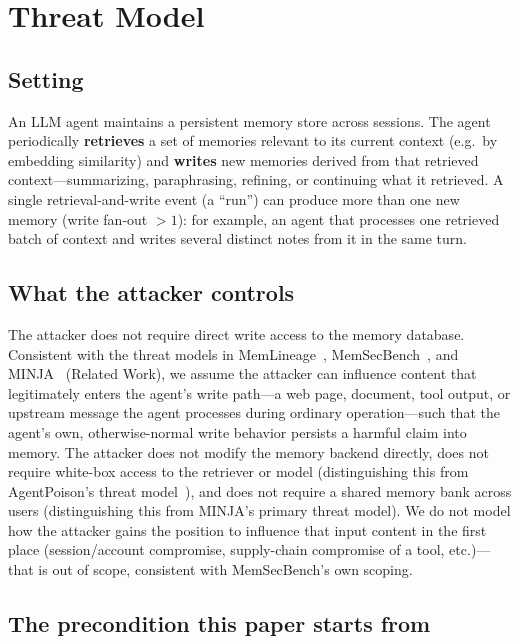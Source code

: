 \section{Threat Model}
\label{sec:threat-model}

\subsection{Setting}

An LLM agent maintains a persistent memory store across sessions. The
agent periodically \textbf{retrieves} a set of memories relevant to its
current context (e.g.\ by embedding similarity) and \textbf{writes} new
memories derived from that retrieved context---summarizing,
paraphrasing, refining, or continuing what it retrieved. A single
retrieval-and-write event (a ``run'') can produce more than one new
memory (write fan-out $> 1$): for example, an agent that processes one
retrieved batch of context and writes several distinct notes from it in
the same turn.

\subsection{What the attacker controls}

The attacker does not require direct write access to the memory
database. Consistent with the threat models in
MemLineage~\cite{memlineage}, MemSecBench~\cite{memsecbench}, and
MINJA~\cite{minja} (Related Work), we assume the attacker can influence
content that legitimately enters the agent's write path---a web page,
document, tool output, or upstream message the agent processes during
ordinary operation---such that the agent's own, otherwise-normal write
behavior persists a harmful claim into memory. The attacker does not
modify the memory backend directly, does not require white-box access
to the retriever or model (distinguishing this from AgentPoison's
threat model~\cite{agentpoison}), and does not require a shared memory
bank across users (distinguishing this from MINJA's primary threat
model). We do not model how the attacker gains the position to
influence that input content in the first place (session/account
compromise, supply-chain compromise of a tool, etc.)---that is out of
scope, consistent with MemSecBench's own scoping.

\subsection{The precondition this paper starts from}

